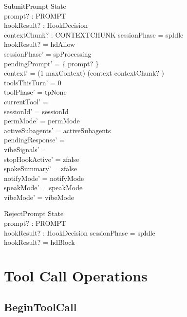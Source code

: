 \documentclass[a4paper,10pt,fleqn]{article}
\begin{document}
\begin{schema}{SubmitPrompt}
  \Delta State \\
  prompt? : PROMPT \\
  hookResult? : HookDecision \\
  contextChunk? : CONTEXTCHUNK
  \where
  sessionPhase = spIdle \\
  hookResult? = hdAllow \\
  sessionPhase' = spProcessing \\
  pendingPrompt' = \{ prompt? \} \\
  context' = (1 \upto maxContext) \dres (context \cat \langle contextChunk? \rangle) \\
  toolsThisTurn' = 0 \\
  toolPhase' = tpNone \\
  currentTool' = \emptyset \\
  sessionId' = sessionId \\
  permMode' = permMode \\
  activeSubagents' = activeSubagents \\
  pendingResponse' = \emptyset \\
  vibeSignals' = \emptyset \\
  stopHookActive' = zfalse \\
  spokeSummary' = zfalse \\
  notifyMode' = notifyMode \\
  speakMode' = speakMode \\
  vibeMode' = vibeMode
\end{schema}

\begin{schema}{RejectPrompt}
  \Xi State \\
  prompt? : PROMPT \\
  hookResult? : HookDecision
  \where
  sessionPhase = spIdle \\
  hookResult? = hdBlock
\end{schema}

\section{Tool Call Operations}

\subsection{BeginToolCall}
\end{document}
